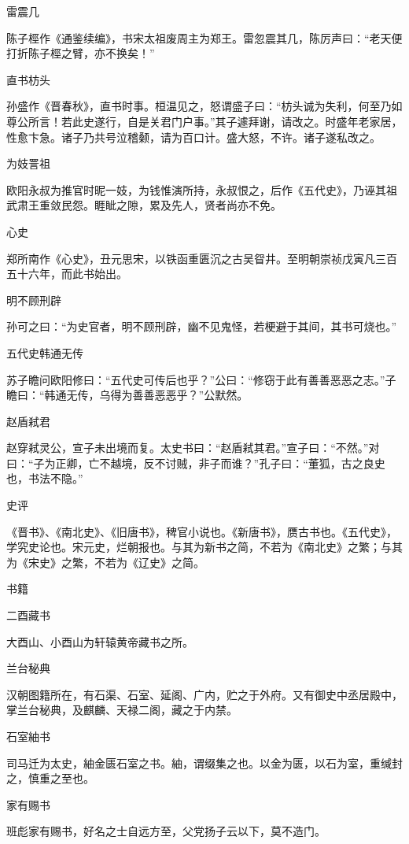 \documentclass[a4paper,12pt,UTF8,twoside]{ctexbook}
\begin{document}
    雷震几
    
    陈子桱作《通鉴续编》，书宋太祖废周主为郑王。雷忽震其几，陈厉声曰：“老天便打折陈子桱之臂，亦不换矣！”
    
    直书枋头
    
    孙盛作《晋春秋》，直书时事。桓温见之，怒谓盛子曰：“枋头诚为失利，何至乃如尊公所言！若此史遂行，自是关君门户事。”其子遽拜谢，请改之。时盛年老家居，性愈卞急。诸子乃共号泣稽颡，请为百口计。盛大怒，不许。诸子遂私改之。
    
    为妓詈祖
    
    欧阳永叔为推官时昵一妓，为钱惟演所持，永叔恨之，后作《五代史》，乃诬其祖武肃王重敛民怨。睚眦之隙，累及先人，贤者尚亦不免。
    
    心史
    
    郑所南作《心史》，丑元思宋，以铁函重匮沉之古吴眢井。至明朝崇祯戊寅凡三百五十六年，而此书始出。
    
    明不顾刑辟
    
    孙可之曰：“为史官者，明不顾刑辟，幽不见鬼怪，若梗避于其间，其书可烧也。”
    
    五代史韩通无传
    
    苏子瞻问欧阳修曰：“五代史可传后也乎？”公曰：“修窃于此有善善恶恶之志。”子瞻曰：“韩通无传，乌得为善善恶恶乎？”公默然。
    
    赵盾弒君
    
    赵穿弒灵公，宣子未出境而复。太史书曰：“赵盾弒其君。”宣子曰：“不然。”对曰：“子为正卿，亡不越境，反不讨贼，非子而谁？”孔子曰：“董狐，古之良史也，书法不隐。”
    
    史评
    
    《晋书》、《南北史》、《旧唐书》，稗官小说也。《新唐书》，赝古书也。《五代史》，学究史论也。宋元史，烂朝报也。与其为新书之简，不若为《南北史》之繁；与其为《宋史》之繁，不若为《辽史》之简。
    
    书籍
    
    二酉藏书
    
    大酉山、小酉山为轩辕黄帝藏书之所。
    
    兰台秘典
    
    汉朝图籍所在，有石渠、石室、延阁、广内，贮之于外府。又有御史中丞居殿中，掌兰台秘典，及麒麟、天禄二阁，藏之于内禁。
    
    石室紬书
    
    司马迁为太史，紬金匮石室之书。紬，谓缀集之也。以金为匮，以石为室，重缄封之，慎重之至也。
    
    家有赐书
    
    班彪家有赐书，好名之士自远方至，父党扬子云以下，莫不造门。
    
\end{document}
